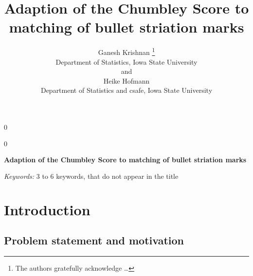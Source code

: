 \documentclass[12pt]{article}
\newcommand{\blind}{0}
\begin{document}
\def\spacingset#1{\renewcommand{\baselinestretch}%
{#1}\small\normalsize} \spacingset{1}



\blind
{
  \title{\bf Adaption of the Chumbley Score to matching of bullet striation marks}

  \author{
        Ganesh Krishnan \thanks{The authors gratefully acknowledge \ldots{}} \\
    Department of Statistics, Iowa State University\\
     and \\     Heike Hofmann \\
    Department of Statistics and csafe, Iowa State University\\
      }
  \maketitle
} \fi

\blind
{
  \bigskip
  \bigskip
  \bigskip
  \begin{center}
    {\LARGE\bf Adaption of the Chumbley Score to matching of bullet striation marks}
  \end{center}
  \medskip
} \fi

\bigskip
\begin{abstract}

\end{abstract}

\noindent%
{\it Keywords:} 3 to 6 keywords, that do not appear in the title
\vfill

\newpage
\spacingset{1.45} %

\newcommand{\hh}[1]{{\textcolor{orange}{#1}}}
\newcommand{\gk}[1]{{\textcolor{green}{#1}}}
\newcommand{\cited}[1]{{\textcolor{red}{#1}}}








\section{Introduction}\label{introduction}

\subsection{Problem statement and
motivation}\label{problem-statement-and-motivation}
\end{document}
